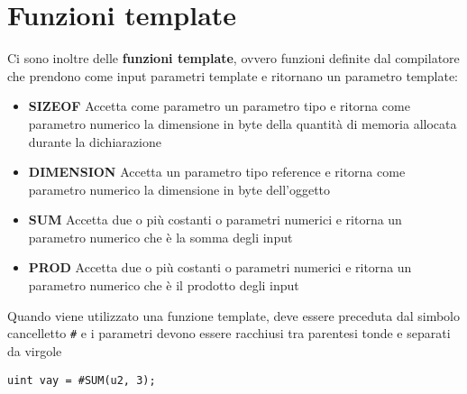 \documentclass[10pt]{book}%
\newcommand{\e}{\`{e} }
\newcommand{\ac}[1]{\`{#1}}
\renewcommand{\emph}[1]{\textbf{#1}}
\newenvironment{codeenv}{
\begin{mdframed}[backgroundcolor=black!20,topline=false,leftline=false,rightline=false,bottomline=false]
}
{\end{mdframed}}
\begin{document}
\section{Funzioni template}
Ci sono inoltre delle \emph{funzioni template}, ovvero funzioni definite dal compilatore che prendono come input parametri template e ritornano un parametro template:
\begin{itemize}
\item \emph{SIZEOF} Accetta come parametro un parametro tipo e ritorna come parametro numerico la dimensione in byte della quantit\ac a di memoria allocata durante la dichiarazione
\item \emph{DIMENSION} Accetta un parametro tipo reference e ritorna come parametro numerico la dimensione in byte dell'oggetto
\item \emph{SUM} Accetta due o pi\ac u costanti o parametri numerici e ritorna un parametro numerico che \e la somma degli input
\item \emph{PROD} Accetta due o pi\ac u costanti o parametri numerici e ritorna un parametro numerico che \e il prodotto degli input
\end{itemize}
Quando viene utilizzato una funzione template, deve essere preceduta dal simbolo cancelletto \verb&#& e i parametri devono essere racchiusi tra parentesi tonde e separati da virgole
\begin{codeenv}
\begin{verbatim}
uint vay = #SUM(u2, 3);
\end{verbatim}
\end{codeenv}

\appendix
\end{document}
